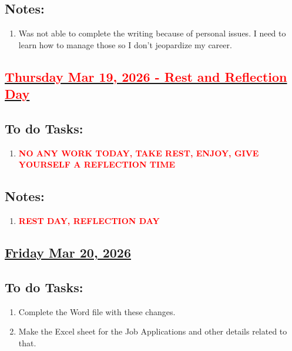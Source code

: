 \subsection*{Notes:}
\begin{enumerate}
    \item Was not able to complete the writing because of personal issues. I need to learn how to manage those so I don't jeopardize my career.
\end{enumerate}
\subsection*{\underline{\textcolor{red}{Thursday Mar 19, 2026 - Rest and Reflection Day}}}
\subsection*{To do Tasks:}
\begin{enumerate}
\item \textcolor{red}{\textbf{NO ANY WORK TODAY, TAKE REST, ENJOY, GIVE YOURSELF A REFLECTION TIME}}
\end{enumerate}
\subsection*{Notes:}
\begin{enumerate}
    \item \textcolor{red}{\textbf{REST DAY, REFLECTION DAY}}
\end{enumerate}
\subsection*{\underline{Friday Mar 20, 2026}}
\subsection*{To do Tasks:}
\begin{enumerate}
    
   \item Complete the Word file with these changes.
    \item Make the Excel sheet for the Job Applications and other details related to that.
\end{enumerate}

